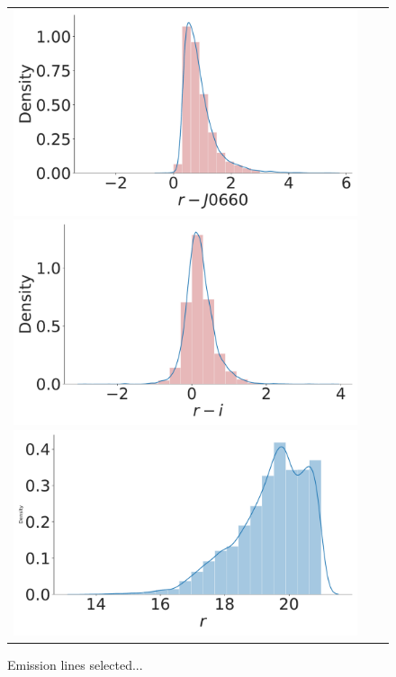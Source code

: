\documentclass[fleqn,usenatbib]{mnras}
\begin{document}
\begin{figure}
  \begin{tabular}{l l l}
  \includegraphics[width=0.7\columnwidth]{Figs/distribution-Halpha.pdf} 
    \includegraphics[width=0.7\columnwidth]{Figs/distribution-ri.pdf}
    \includegraphics[width=0.7\columnwidth]{Figs/distribution_r.pdf}
  \end{tabular}
    \caption{Emission lines selected...}
    \label{fig:diagram-distri}
\end{figure}
\end{document}
